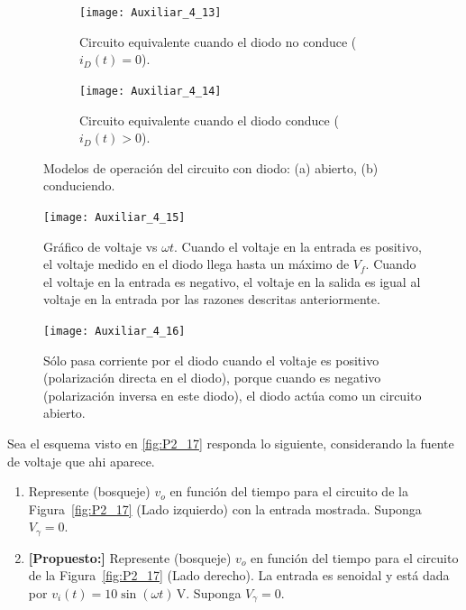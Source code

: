 \documentclass[
  11pt,
  letterpaper,
   addpoints,
  ]{exam}
\begin{document}
\begin{questions}
\begin{solution}
\begin{figure}[H]
  \centering
  \begin{subfigure}[b]{0.48\textwidth}
    \centering
    \texttt{[image: Auxiliar\_4\_13]}
    \caption{Circuito equivalente cuando el diodo no conduce ($i_D(t) = 0$).}
    \label{fig:diodo-abierto}
  \end{subfigure}\hfill
  \begin{subfigure}[b]{0.48\textwidth}
    \centering
    \texttt{[image: Auxiliar\_4\_14]}
    \caption{Circuito equivalente cuando el diodo conduce ($i_D(t) > 0$).}
    \label{fig:diodo-conduce}
  \end{subfigure}
  \caption{Modelos de operación del circuito con diodo: (a) abierto, (b) conduciendo.}
  \label{fig:diodo-operacion-casos}
\end{figure}
\begin{figure}[H]
    \centering
    \texttt{[image: Auxiliar\_4\_15]}
  \caption{Gráfico de voltaje vs $\omega t$. Cuando el voltaje en la entrada es positivo, el voltaje medido en el diodo llega hasta un máximo de $V_f$. Cuando el voltaje en la entrada es negativo, el voltaje en la salida es igual al voltaje en la entrada por las razones descritas anteriormente.}
    \label{fig:voltaje-corriente-diodo}
\end{figure}
\begin{figure}[H]
    \centering
    \texttt{[image: Auxiliar\_4\_16]}
  \caption{Sólo pasa corriente por el diodo cuando el voltaje es positivo (polarización directa en el diodo), porque cuando es negativo (polarización inversa en este diodo), el diodo actúa como un circuito abierto.}
    \label{fig:voltaje-corriente-diodo-detalle}
\end{figure}
\end{solution}
\question Sea el esquema visto en \ref{fig:P2_17} responda lo siguiente, considerando la fuente de voltaje que ahi aparece.
\begin{enumerate}
    \item Represente (bosqueje) \(v_o\) en función del tiempo para el circuito de la Figura~\ref{fig:P2_17} (Lado izquierdo)
    con la entrada mostrada. Suponga \(V_\gamma = 0\).
    \item \textbf{[Propuesto:]} Represente (bosqueje) \(v_o\) en función del tiempo para el circuito de la
  Figura~\ref{fig:P2_17} (Lado derecho). La entrada es senoidal y está dada por
  \(v_i(t) = 10 \sin(\omega t)\,\text{V}\). Suponga \(V_\gamma = 0\).
\end{enumerate}


\end{questions}
\end{document}
